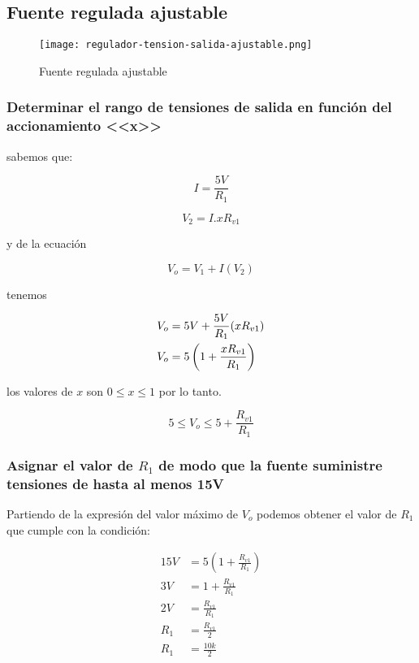 \subsection{Fuente regulada ajustable}

\begin{figure}[ht]
    \centering
    \texttt{[image: regulador-tension-salida-ajustable.png]}
    \caption{Fuente regulada ajustable}
    \label{fig:regulador-tension-salida-ajustable}
\end{figure}

\subsubsection*{Determinar el rango de tensiones de salida en función del accionamiento <<x>>}

sabemos que:

$$ I = \frac{5 V}{R_1}$$

$$ V_2 = I . x R_{v1}$$

y de la ecuación

\begin{equation}
    V_o = V_1 + I(V_2)
\end{equation}
 
tenemos 

\begin{align*}
    V_o &= 5V + \frac{5 V}{R_1} (x R_{v1}) \\
    V_o &= 5 \left( 1 + \frac{x R_{v1}}{R_{1}} \right) \\
\end{align*}

los valores de $x$ son $ 0 \leq x \leq 1$ por lo tanto.

\begin{equation}
    5 \leq V_o \leq 5 + \frac{R_{v1}}{R_{1}}
\end{equation}

\subsubsection*{Asignar el valor de $R_1$ de modo que la fuente suministre tensiones de hasta al menos 15V}

Partiendo de la expresión del valor máximo de $V_o$ podemos obtener el valor de $R_1$ que cumple con la condición:

\begin{align*}
    15V &= 5(1 + \frac{R_{v1}}{R_{1}}) \\
    3V &= 1 + \frac{R_{v1}}{R_{1}} \\
    2V &= \frac{R_{v1}}{R_{1}} \\
    R_{1} &= \frac{R_{v1}}{2} \\
    R_{1} &=  \frac{10k}{2} \\
\end{align*}

